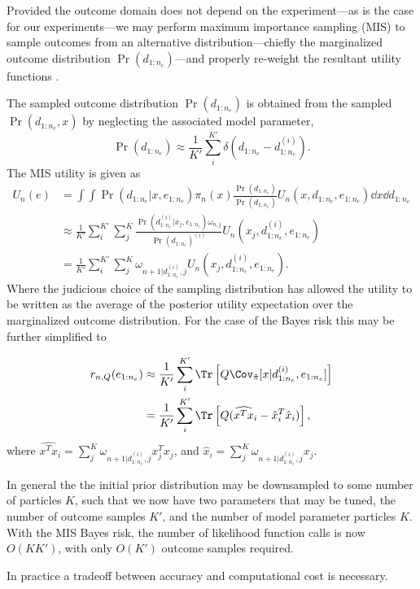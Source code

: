\documentclass[aps,nofootinbib,twocolumn,superscriptaddress]{revtex4}
\newcommand{\mps}{x}
\newcommand{\eps}{e}
\newcommand{\data}{d}
\begin{document}
Provided the outcome domain does not depend on the experiment---as is the case for our experiments---we may perform maximum importance sampling (MIS) to sample outcomes from an alternative distribution---chiefly the marginalized outcome distribution $\Pr(d_{1:n_e})$---and properly re-weight the resultant utility functions \cite{UeberhuberNumericalComputationMethods1997}. 

The sampled outcome distribution $\Pr(d_{1:n_e})$ is obtained from the sampled $\Pr(\data_{1:n_e},\mps)$ by neglecting the associated model parameter,
\begin{equation}
\Pr(\data_{1:n_e}) \approx \frac{1}{K'}\sum \limits_{i}^{K'} \delta \left(\data_{1:n_e}-\data_{1:n_e}^{(i)}\right).
\label{eq:sampled-marginalized-distribution}
\end{equation}
The MIS utility is given as 
\begin{align}
    U_n(\eps)
        &= \int\int \Pr(\data_{1:n_e}|\mps,\eps_{1:n_e})\pi_n(\mps)\frac{\Pr(\data_{1:n_e})}{\Pr(\data_{1:n_e})}U_n(\mps,\data_{1:n_e},\eps_{1:n_e})\dd\mps \dd\data_{1:n_e} \nonumber\\     
&\approx \frac{1}{K'}\sum \limits_{i}^{K'}\sum \limits_{j}^{K} \frac{\Pr(\data_{1:n_e}^{(i)}|\mps_j,\eps_{1:n_e})\omega_{n,j}}{\Pr(\data_{1:n_e})^{(i)}}U_n(\mps_j,\data_{1:n_e}^{(i)},\eps_{1:n_e})\nonumber \\
&= \frac{1}{K'}\sum \limits_{i}^{K'}\sum \limits_{j}^{K} \omega_{n+1|\data_{1:n_e}^{(i)},j}U_n(\mps_j,\data_{1:n_e}^{(i)},\eps_{1:n_e}).
\label{eq:mis-average-utility-expanded}
\end{align}
Where the judicious choice of the sampling distribution has allowed the utility to be written as the average of the posterior utility expectation  over the marginalized outcome distribution. For the case of the Bayes risk this may be further simplified to 

\begin{align}
r_{n,Q}(\eps_{1:n_e}) &\approx \frac{1}{K'}\sum \limits_i^{K'}  \Tr\left[ Q  \Cov_{\tilde{\pi}}
        [\mps|\data_{1:n_e}^{(i)},\eps_{1:n_e}]\right] \nonumber\\
        &=\frac{1}{K'}\sum \limits_i^{K'}  \Tr\left[ Q(\widehat{x^Tx}_{i}-\hat{x}_i^T\hat{x}_i)\right],
\label{eq:mis-bayes-risk-sampled}
\end{align}
where $\widehat{x^Tx}_i=\sum \limits_{j}^K\omega_{n+1|\data_{1:n_e}^{(i)},j}x_j^Tx_j$, and $\hat{x}_i=\sum \limits_{j}^K\omega_{n+1|\data_{1:n_e}^{(i)},j}x_j$. 

In general the the initial prior distribution may be downsampled to some number of particles $K$, such that we now have two parameters that may be tuned, the number of outcome samples $K'$, and the number of model parameter particles $K$. With the MIS Bayes risk, the number of likelihood function calls is now $O(KK')$, with only $O(K')$ outcome samples required. 

In practice a tradeoff between accuracy and computational cost is necessary.

  
\end{document}

